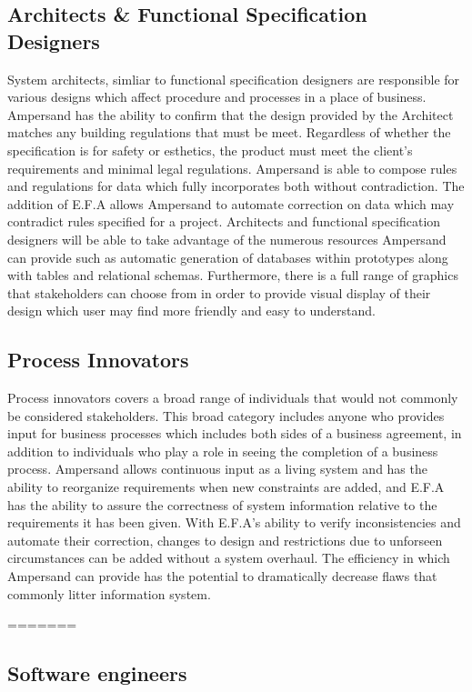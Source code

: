 \documentclass[12pt]{report}
\begin{document}
\subsection{Architects \& Functional Specification Designers}
System architects, simliar to functional specification designers are 
responsible for various designs which affect procedure and processes in a place 
of business. Ampersand has the ability to confirm that the design provided by 
the Architect matches any building regulations that must be meet. Regardless of 
whether the specification is for safety or esthetics, the product must meet the 
client's requirements and minimal legal regulations. Ampersand is able to 
compose rules and regulations for data which fully incorporates both without 
contradiction. The addition of E.F.A allows Ampersand to automate correction  
on data which may contradict rules specified for a project. Architects and 
functional specification designers will be able to take advantage of the 
numerous resources Ampersand can provide such as automatic generation of 
databases within prototypes along with tables and relational schemas. 
Furthermore, there is a full range of graphics that stakeholders can choose 
from in order to provide visual display of their design which user may find 
more friendly and easy to understand. 
\subsection{Process Innovators}
Process innovators covers a broad range of individuals that would not commonly 
be considered stakeholders. This broad category includes anyone who provides 
input for business processes which includes both sides of a business agreement, 
in addition to individuals who play a role in seeing the completion of a 
business process. Ampersand allows continuous input as a living system and has 
the ability to reorganize requirements when new constraints are added, and 
E.F.A has the ability to assure the correctness of system information relative 
to the requirements it has been given. With E.F.A's ability to verify 
inconsistencies and automate their correction, changes to design and 
restrictions due to unforseen circumstances can be added without a system 
overhaul. The efficiency in which Ampersand can provide has the potential to 
dramatically decrease flaws that commonly litter information system.

=======
\subsection{Software engineers}\label{subsec:SftwReq}
\end{document}

